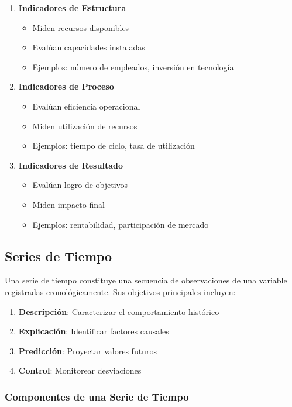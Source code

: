 \documentclass[12pt,letterpaper,oneside]{book}
\begin{document}
\begin{enumerate}
\item \textbf{Indicadores de Estructura}
   \begin{itemize}
   \item Miden recursos disponibles
   \item Evalúan capacidades instaladas
   \item Ejemplos: número de empleados, inversión en tecnología
   \end{itemize}

\item \textbf{Indicadores de Proceso}
   \begin{itemize}
   \item Evalúan eficiencia operacional
   \item Miden utilización de recursos
   \item Ejemplos: tiempo de ciclo, tasa de utilización
   \end{itemize}

\item \textbf{Indicadores de Resultado}
   \begin{itemize}
   \item Evalúan logro de objetivos
   \item Miden impacto final
   \item Ejemplos: rentabilidad, participación de mercado
   \end{itemize}
\end{enumerate}

\subsection{Series de Tiempo}

Una serie de tiempo constituye una secuencia de observaciones de una variable registradas cronológicamente. Sus objetivos principales incluyen:

\begin{enumerate}
\item \textbf{Descripción}: Caracterizar el comportamiento histórico
\item \textbf{Explicación}: Identificar factores causales
\item \textbf{Predicción}: Proyectar valores futuros
\item \textbf{Control}: Monitorear desviaciones
\end{enumerate}

\subsubsection{Componentes de una Serie de Tiempo}
\end{document}

